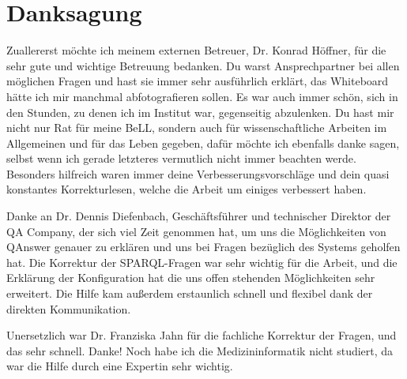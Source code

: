 


\bigskip

\begingroup
\let\clearpage\relax
\let\cleardoublepage\relax
\let\cleardoublepage\relax
\chapter*{Danksagung}

Zuallererst möchte ich meinem externen Betreuer, Dr. Konrad Höffner, für die sehr gute und wichtige Betreuung bedanken.
Du warst Ansprechpartner bei allen möglichen Fragen und hast sie immer sehr ausführlich erklärt, das Whiteboard hätte ich mir manchmal abfotografieren sollen.
Es war auch immer schön, sich in den Stunden, zu denen ich im Institut war, gegenseitig abzulenken.
Du hast mir nicht nur Rat für meine BeLL, sondern auch für wissenschaftliche Arbeiten im Allgemeinen und für das Leben gegeben, dafür möchte ich ebenfalls danke sagen, selbst wenn ich gerade letzteres vermutlich nicht immer beachten werde.
Besonders hilfreich waren immer deine Verbesserungsvorschläge und dein quasi konstantes Korrekturlesen, welche die Arbeit um einiges verbessert haben.

Danke an Dr. Dennis Diefenbach, Geschäftsführer und technischer Direktor der QA Company, der sich viel Zeit genommen hat, um uns die Möglichkeiten von QAnswer genauer zu erklären und uns bei Fragen bezüglich des Systems geholfen hat.
Die Korrektur der SPARQL-Fragen war sehr wichtig für die Arbeit, und die Erklärung der Konfiguration hat die uns offen stehenden Möglichkeiten sehr erweitert.
Die Hilfe kam außerdem erstaunlich schnell und flexibel dank der direkten Kommunikation.

Unersetzlich war Dr. Franziska Jahn für die fachliche Korrektur der Fragen, und das sehr schnell.
Danke!
Noch habe ich die Medizininformatik nicht studiert, da war die Hilfe durch eine Expertin sehr wichtig.

